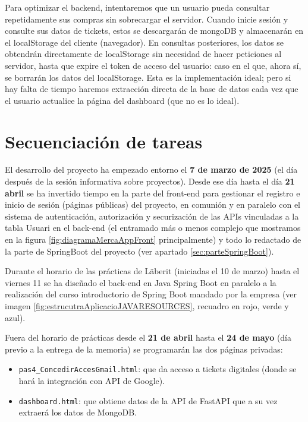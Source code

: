 \documentclass[a4paper,12pt]{report}
\begin{document}
		Para optimizar el backend, intentaremos que un usuario pueda consultar repetidamente sus compras sin sobrecargar el servidor. Cuando inicie sesión y consulte sus datos de tickets, estos se descargarán de mongoDB y almacenarán en el localStorage del cliente (navegador). En consultas posteriores, los datos se obtendrán directamente de localStorage sin necesidad de hacer peticiones al servidor, hasta que expire el token de acceso del usuario: caso en el que, ahora sí, se borrarán los datos del localStorage. Esta es la implementación ideal; pero si hay falta de tiempo haremos extracción directa de la base de datos cada vez que el usuario actualice la página del dashboard (que no es lo ideal).
		



		
		\section{Secuenciación de tareas}
		
		El desarrollo del proyecto ha empezado entorno el \textbf{7 de marzo de 2025} (el día después de la sesión informativa sobre proyectos). Desde ese día hasta el día \textbf{21 abril} se ha invertido tiempo en la parte del front-end para gestionar el registro e inicio de sesión (páginas públicas) del proyecto, en comunión y en paralelo con el sistema de autenticación, autorización y securización de las APIs vinculadas a la tabla Usuari en el back-end (el entramado más o menos complejo que mostramos en la figura \ref{fig:diagramaMercaAppFront} principalmente) y todo lo redactado de la parte de SpringBoot del proyecto (ver apartado \ref{sec:parteSpringBoot}).
		
		Durante el horario de las prácticas de Lãberit (iniciadas el 10 de marzo) hasta el viernes 11 se ha diseñado el back-end en Java Spring Boot en paralelo a la realización del curso introductorio de Spring Boot mandado por la empresa (ver imagen \ref{fig:estrucutraAplicacioJAVARESOURCES}, recuadro en rojo, verde y azul).
		
		Fuera del horario de prácticas desde el \textbf{21 de abril} hasta el \textbf{24 de mayo} (día previo a la entrega de la memoria) se programarán las dos páginas privadas: 
		
		\begin{itemize}
			\item \texttt{pas4\_ConcedirAccesGmail.html}: que da acceso a tickets digitales (donde se hará la integración con API de Google).
			\item \texttt{dashboard.html}: que obtiene datos de la API de FastAPI que a su vez extraerá los datos de MongoDB.
		\end{itemize}
\end{document}
